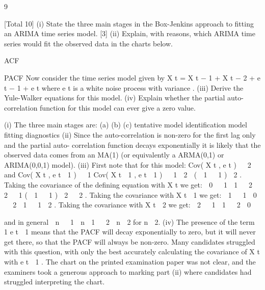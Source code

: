 \documentclass[a4paper,12pt]{article}
\begin{document}
9

[Total 10]
(i) State the three main stages in the Box-Jenkins approach to fitting an ARIMA
time series model.
[3]
(ii) Explain, with reasons, which ARIMA time series would fit the observed data
in the charts below.

ACF

PACF
Now consider the time series model given by
X t =  X t − 1 +  X t − 2 + e t − 1 + e t
where e t is a white noise process with variance  .
(iii) Derive the Yule-Walker equations for this model.
(iv) Explain whether the partial auto-correlation function for this model can ever
give a zero value.

(i)
The three main stages are:
(a)
(b)
(c)
tentative model identification
model fitting
diagnostics
(ii) Since the auto-correlation is non-zero for the first lag only and the partial auto-
correlation function decays exponentially it is likely that the observed data
comes from an MA(1) (or equivalently a ARMA(0,1) or ARIMA(0,0,1)
model).
(iii) First note that for this model:
Cov( X t , e t )   2
and
Cov( X t , e t  1 )   1 Cov( X t  1 , e t  1 )   1  2  (  1   1 )  2 .
Taking the covariance of the defining equation with X t we get:
 0   1  1   2  2   1 (  1   1 )  2   2 .
Taking the covariance with X t  1 we get:
 1   1  0   2  1   1  2 .
Taking the covariance with X t  2 we get:
 2   1  1   2  0

and in general
 n   1  n  1   2  n  2 for n  2.
(iv)
The presence of the term  1 e t  1 means that the PACF will decay exponentially to zero, but it will never get there, so that the PACF will always be non-zero.
Many candidates struggled with this question, with only the best accurately calculating the covariance of X t with e t  1 . The chart on the printed examination paper was not clear, and the
examiners took a generous approach to marking part (ii) where candidates had struggled interpreting the chart.
\end{document}

